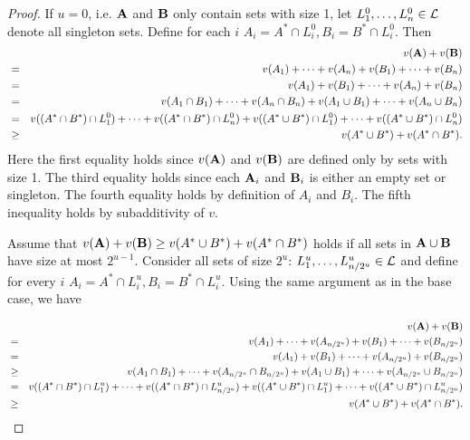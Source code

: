 \begin{proof}
\smallskip
{} If $u=0$, i.e. $\mathbf{A}$ and $\mathbf{B}$ only contain sets with size 1, let $L^{0}_1, \dots, L^{0}_{n} \in \mathcal{L}$ denote all singleton sets. Define for each $i$ $A_i = A^* \cap L^{0}_i, B_i = B^* \cap L^{0}_i$. Then
\begin{eqnarray*}
	& &v(\mathbf{A}) + v(\mathbf{B}) \\
	&=& v(A_1) + \dots + v(A_n) +  v(B_1) + \dots + v(B_n) \\
	& = & v(A_1) + v(B_1) + \dots + v(A_n) + v(B_n) \\
	& = & v(A_1 \cap B_1) + \dots + v(A_n \cap B_n) + v(A_1 \cup B_1) + \dots + v(A_n \cup B_n) \\
	& = & v((A^* \cap B^*) \cap L^{0}_1) + \dots + v( (A^* \cap B^*) \cap L^{0}_n) +  v( (A^* \cup B^*) \cap L^{0}_1) + \dots + v( (A^* \cup B^*) \cap L^{0}_n) \\
	& \geq & v(A^{*} \cup B^{*}) + v(A^{*} \cap B^{*}).
\end{eqnarray*}
Here the first equality holds since $v(\mathbf{A})$ and $v(\mathbf{B})$ are defined only by sets with size 1.
The third equality holds since each $\mathbf{A}_i$ and $\mathbf{B}_i$ is either an empty set or singleton. The fourth equality holds by definition of $A_i$ and $B_i$. The fifth inequality holds by subadditivity of $v$.

\smallskip
{} Assume that $v(\mathbf{A}) + v(\mathbf{B}) \geq v(A^{*} \cup B^{*}) + v(A^{*} \cap B^{*})$ holds if all sets in $\mathbf{A}\cup \mathbf{B}$ have size at most $2^{u-1}$. Consider all sets of size $2^u$: $L^{u}_1, \dots, L^{u}_{n/2^u} \in \mathcal{L}$ and define for every $i$ $A_i = A^* \cap L^{u}_i, B_i = B^* \cap L^{u}_i$. Using the same argument as in the base case, we have 

\begin{eqnarray*}
& &v(\mathbf{A}) + v(\mathbf{B})\\
& = &v(A_1) + \dots + v(A_{n/2^{u}}) +  v(B_1) + \dots + v(B_{n/2^{u}})\\
& =  & v(A_1) + v(B_1) + \dots + v(A_{n/2^{u}}) + v(B_{n/2^{u}}) \\
& \geq & v(A_1 \cap B_1) + \dots + v(A_{n/2^{u}} \cap B_{n/2^{u}}) + v(A_1 \cup B_1) + \dots + v(A_{n/2^{u}} \cup B_{n/2^{u}}) \\
& = & v( (A^* \cap B^*) \cap L^{u}_1) + \dots + v( (A^* \cap B^*) \cap L^{u}_{n/2^{u}}) +  v( (A^* \cup B^*) \cap L^{u}_1) + \dots + v( (A^* \cup B^*) \cap L^{u}_{n/2^{u}}) \\
&\geq &v(A^{*} \cup B^{*}) + v(A^{*} \cap B^{*}).
\end{eqnarray*}


\end{proof}
